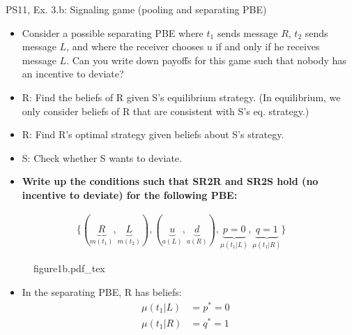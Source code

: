\begin{frame}{PS11, Ex. 3.b: Signaling game (pooling and separating PBE)}
    \begin{itemize}
        \item[(b)] Consider a possible separating PBE where $t_1$ sends message $R$, $t_2$ sends message $L$, and where the receiver chooses $u$ if and only if he receives message $L$. Can you write down payoffs for this game such that nobody has an incentive to deviate?
    \end{itemize} \vspace{-8pt}
    \begin{multicols}{2}
      \begin{itemize}
        \item[SR3:] R: Find the beliefs of R given S's equilibrium strategy. (In equilibrium, we only consider beliefs of R that are consistent with S's eq. strategy.)
        \item[SR2R:] R: Find R's optimal strategy given beliefs about S's strategy.
        \item[SR2S:] S: Check whether S wants to deviate.
        \item[PBE:]  \textbf{Write up the conditions such that SR2R and SR2S hold (no incentive to deviate) for the following PBE:}
      \end{itemize}\vspace{-14pt}
      \begin{align*}
        \{(\underbrace{R}_{m(t_1)},\underbrace{L}_{m(t_2)}),(\underbrace{u}_{a(L)},\underbrace{d}_{a(R)}),\underbrace{p=0}_{\mu(t_1|L)},\underbrace{q=1}_{\mu(t_1|R)}\}
      \end{align*}
      \vfill\null\columnbreak
      \begin{figure}[!h]
        \center
        \def\svgwidth{\columnwidth}
        {figure1b.pdf_tex}
      \end{figure} \vspace{-8pt}
      \begin{itemize}
        \item[SR3:] In the separating PBE, R has beliefs:\vspace{-8pt}
        \begin{align*}
          \mu(t_1|L)&=p^*=0&\\
          \mu(t_1|R)&=q^*=1
        \end{align*}
      \end{itemize}
      \vfill\null \columnbreak
      \vfill
    \end{multicols}
\end{frame}
